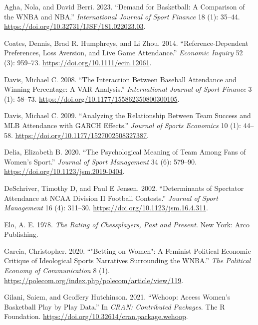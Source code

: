 \documentclass[
  letterpaper,
  DIV=11,
  numbers=noendperiod]{scrartcl}
\newlength{\cslhangindent}
\newenvironment{CSLReferences}[2] %
 {\begin{list}{}{%
  \setlength{\itemindent}{0pt}
  \setlength{\leftmargin}{0pt}
  \setlength{\parsep}{0pt}
  \ifodd #1
   \setlength{\leftmargin}{\cslhangindent}
   \setlength{\itemindent}{-1\cslhangindent}
  \fi
  \setlength{\itemsep}{#2\baselineskip}}}
 {\end{list}}
\begin{document}
\protect{}\label{refs}
\begin{CSLReferences}{1}{1}
Agha, Nola, and David Berri. 2023. {``Demand for Basketball: A
Comparison of the WNBA and NBA.''} \emph{International Journal of Sport
Finance} 18 (1): 35--44.
\url{https://doi.org/10.32731/IJSF/181.022023.03}.

Coates, Dennis, Brad R. Humphreys, and Li Zhou. 2014.
{``Reference-Dependent Preferences, Loss Aversion, and Live Game
Attendance.''} \emph{Economic Inquiry} 52 (3): 959--73.
\url{https://doi.org/10.1111/ecin.12061}.

Davis, Michael C. 2008. {``The Interaction Between Baseball Attendance
and Winning Percentage: A VAR Analysis.''} \emph{International Journal
of Sport Finance} 3 (1): 58--73.
\url{https://doi.org/10.1177/155862350800300105}.

Davis, Michael C. 2009. {``Analyzing the Relationship Between Team
Success and MLB Attendance with GARCH Effects.''} \emph{Journal of
Sports Economics} 10 (1): 44--58.
\url{https://doi.org/10.1177/1527002508327387}.

Delia, Elizabeth B. 2020. {``The Psychological Meaning of Team Among
Fans of Women's Sport.''} \emph{Journal of Sport Management} 34 (6):
579--90. \url{https://doi.org/10.1123/jsm.2019-0404}.

DeSchriver, Timothy D, and Paul E Jensen. 2002. {``Determinants of
Spectator Attendance at NCAA Division II Football Contests.''}
\emph{Journal of Sport Management} 16 (4): 311--30.
\url{https://doi.org/10.1123/jsm.16.4.311}.

Elo, A. E. 1978. \emph{The Rating of Chessplayers, Past and Present}.
New York: Arco Publishing.

Garcia, Christopher. 2020. {``"Betting on Women": A Feminist Political
Economic Critique of Ideological Sports Narratives Surrounding the
WNBA.''} \emph{The Political Economy of Communication} 8 (1).
\url{https://polecom.org/index.php/polecom/article/view/119}.

Gilani, Saiem, and Geoffery Hutchinson. 2021. {``Wehoop: Access Women's
Basketball Play by Play Data.''} In \emph{CRAN: Contributed Packages}.
The R Foundation. \url{https://doi.org/10.32614/cran.package.wehoop}.


\end{CSLReferences}
\end{document}
